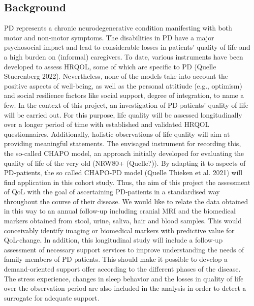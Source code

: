 \subsection{Background}
\ac{PD} represents a chronic neurodegenerative condition manifesting with both motor and non-motor symptoms. The disabilities in \ac{PD} have a major psychosocial impact and lead to considerable losses in patients' quality of life and a high burden on (informal) caregivers. To date, various instruments have been developed to assess \ac{HRQOL}, some of which are specific to \ac{PD} (Quelle Stuerenberg 2022). Nevertheless, none of the models take into account the positive aspects of well-being, as well as the personal attitiude (e.g., optimism) and social resilience factors like social support, degree of integration, to name a few. In the context of this project, an investigation of \ac{PD}-patients' quality of life will be carried out. For this purpose, life quality will be assessed longitudinally over a longer period of time with established and validated \ac{HRQOL} questionnaires. Additionally, holistic observations of life quality will aim at providing meaningful statements. The envisaged instrument for recording this, the so-called \ac{CHAPO} model, an approach initially developed for evaluating the quality of life of the very old (NRW80+ (Quelle?)). By adapting it to aspects of \ac{PD}-patients, the so called \acs{CHAPO}-\ac{PD} model (Quelle Thieken et al. 2021) will find application in this cohort study. Thus, the aim of this project the assessment of \ac{QoL} with the goal of ascertaining \ac{PD}-patients in a standardised way throughout the course of their disease. We would like to relate the data obtained in this way to an annual follow-up including cranial \ac{MRI} and the biomedical markers obtained from stool, urine, saliva, hair and blood samples. This would conceivably identify imaging or biomedical markers with predictive value for \ac{QoL}-change. In addition, this longitudinal study will include a follow-up assessment of necessary support services to improve understanding the needs of family members of \ac{PD}-patients. This should make it possible to develop a demand-oriented support offer according to the different phases of the disease. The stress experience, changes in sleep behavior and the losses in quality of life over the observation period are also included in the analysis in order to detect a surrogate for adequate support.

